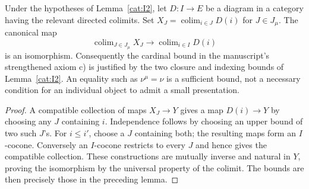 \begin{proposition}\label{cat:I3}
Under the hypotheses of Lemma~\ref{cat:I2}, let $D:I\to E$ be a
diagram in a category having the relevant directed colimits.  Set
$X_J=\operatorname{colim}_{i\in J}D(i)$ for $J\in J_\mu$.
The canonical map
\[
 \operatorname{colim}_{J\in J_\mu}X_J
 \longrightarrow\operatorname{colim}_{i\in I}D(i)
\]
is an isomorphism.  Consequently the cardinal bound in the
manuscript's strengthened axiom c) is justified by the two closure
and indexing bounds of Lemma~\ref{cat:I2}.  An equality such as
$\nu^\mu=\nu$ is a sufficient bound, not a necessary condition for an
individual object to admit a small presentation.
\end{proposition}
\begin{proof}
A compatible collection of maps $X_J\to Y$ gives a map $D(i)\to Y$
by choosing any $J$ containing $i$.  Independence follows by choosing
an upper bound of two such $J$'s.  For $i\leq i'$, choose a $J$
containing both; the resulting maps form an $I$-cocone.  Conversely
an $I$-cocone restricts to every $J$ and hence gives the compatible
collection.  These constructions are mutually inverse and natural in
$Y$, proving the isomorphism by the universal property of the colimit.
The bounds are then precisely those in the preceding lemma.
\end{proof}

